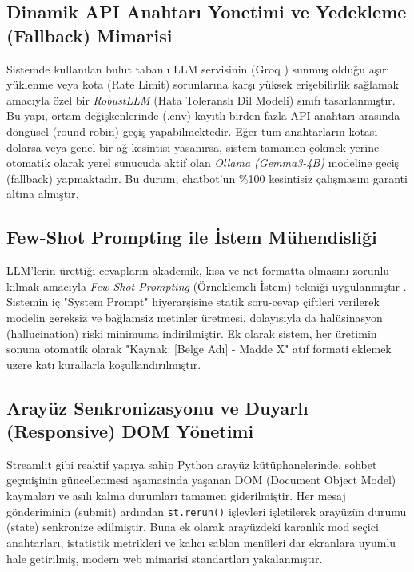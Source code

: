 \documentclass[12pt,a4paper]{report}
\begin{document}
\subsection{Dinamik API Anahtarı Yonetimi ve Yedekleme (Fallback) Mimarisi}
Sistemde kullanılan bulut tabanlı LLM servisinin (Groq \cite{abts2020think}) sunmuş olduğu aşırı yüklenme veya kota (Rate Limit) sorunlarına karşı yüksek erişebilirlik sağlamak amacıyla özel bir \textit{RobustLLM} (Hata Toleranslı Dil Modeli) sınıfı tasarlanmıştır. Bu yapı, ortam değişkenlerinde (.env) kayıtlı birden fazla API anahtarı arasında döngüsel (round-robin) geçiş yapabilmektedir. Eğer tum anahtarların kotası dolarsa veya genel bir ağ kesintisi yasanırsa, sistem tamamen çökmek yerine otomatik olarak yerel sunucuda aktif olan \textit{Ollama (Gemma3-4B)} modeline geciş (fallback) yapmaktadır. Bu durum, chatbot'un \%100 kesintisiz çalışmasını garanti altına almıştır.

\subsection{Few-Shot Prompting ile İstem Mühendisliği}
LLM'lerin ürettiği cevapların akademik, kısa ve net formatta olmasını zorunlu kılmak amacıyla \textit{Few-Shot Prompting} (Örneklemeli İstem) tekniği uygulanmıştır \cite{brown2020language}. Sistemin iç "System Prompt" hiyerarşisine statik soru-cevap çiftleri verilerek modelin gereksiz ve bağlamsiz metinler üretmesi, dolayısıyla da halüsinasyon (hallucination) riski minimuma indirilmiştir. Ek olarak sistem, her üretimin sonuna otomatik olarak "Kaynak: [Belge Adı] - Madde X" atıf formati eklemek uzere katı kurallarla koşullandırılmıştır.

\subsection{Arayüz Senkronizasyonu ve Duyarlı (Responsive) DOM Yönetimi}
Streamlit gibi reaktif yapıya sahip Python arayüz kütüphanelerinde, sohbet geçmişinin güncellenmesi aşamasinda yaşanan DOM (Document Object Model) kaymaları ve asılı kalma durumları tamamen giderilmiştir. Her mesaj gönderiminin (submit) ardından \texttt{st.rerun()} işlevleri işletilerek arayüzün durumu (state) senkronize edilmiştir. Buna ek olarak arayüzdeki karanlık mod seçici anahtarları, istatistik metrikleri ve kalıcı sablon menüleri dar ekranlara uyumlu hale getirilmiş, modern web mimarisi standartları yakalanmıştır.

\end{document}
